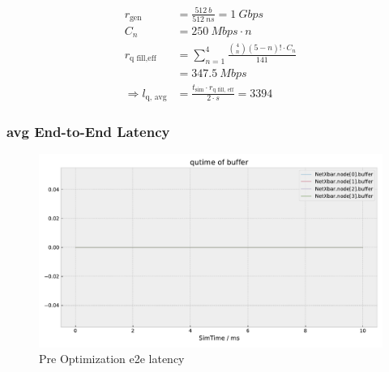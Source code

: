 \documentclass[]{scrartcl}
\begin{document}
        \begin{align}
            r_\text{gen} &= \frac{\SI{512}{b}}{\SI{512}{ns}} = \SI{1}{Gbps}\\
            C_n &= \SI{250}{Mbps}\cdot n\\
            r_\text{q fill,eff} &= \sum_{n=1}^4 \frac{\binom{4}{n}\left( 5-n \right)! \cdot C_n }{141}\\
                                &= \SI{347.5}{Mbps}\\
            \Rightarrow l_\text{q, avg} &= \frac{t_\text{sim}\cdot r_\text{q fill, eff}}{2\cdot s} = 3394
        \end{align}

    \subsubsection{avg End-to-End Latency}
    \begin{figure}[ht]
        \centering
        \includegraphics[width=\columnwidth, page=8]{../../python/results/preopt-General-0}
        \caption{Pre Optimization e2e latency}%
        \label{fig:preopt-2e2}
    \end{figure}
\end{document}
